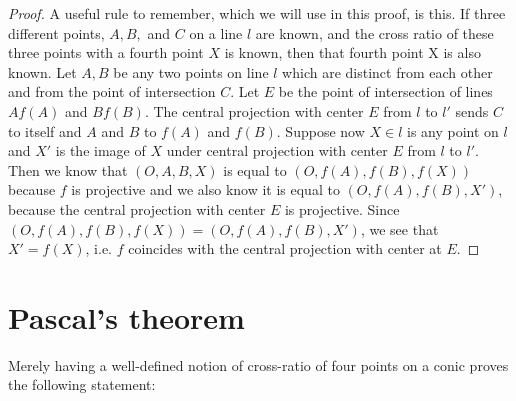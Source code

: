 \begin{proof}
A useful rule to remember, which we will use in this proof, is this. If three different points, $A,B,$ and $C$ on a line $l$ are known, and the cross ratio of these three points with a fourth point $X$ is known, then that fourth point X is also known.
Let $A,B$ be any two points on line $l$ which are distinct from each other and from the point of intersection $C$. Let $E$ be the point of intersection of lines $Af(A)$ and $Bf(B)$. The central projection with center $E$ from $l$ to $l'$ sends $C$ to itself and $A$ and $B$ to $f(A)$ and $f(B)$. Suppose now $X\in l$ is any point on $l$ and $X'$ is the image of $X$ under central projection with center $E$ from $l$ to $l'$. Then we know that $(O,A,B,X)$ is equal to $(O,f(A),f(B),f(X))$ because $f$ is projective and we also know it is equal to $(O,f(A),f(B),X')$, because the central projection with center $E$ is projective. Since $(O,f(A),f(B),f(X))=(O,f(A),f(B),X')$, we see that $X'=f(X)$, i.e. $f$ coincides with the central projection with center at $E$.
\end{proof}


\section{Pascal's theorem}

Merely having a well-defined notion of cross-ratio of four points on a conic proves the following statement:

